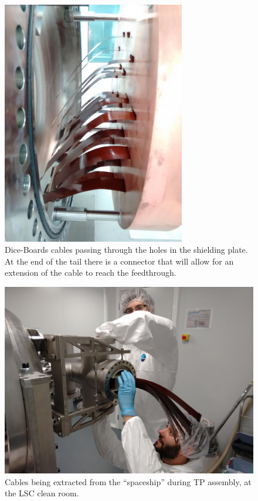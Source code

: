 \begin{figure}[hpt!]
\begin{center}
\includegraphics[width=8cm]{img2/cabling.png}
\caption{Dice-Boards cables passing through the holes in the shielding plate. At the end of the tail there is a connector that will allow for an extension of the cable to reach the feedthrough.}
\label{fig:cabling}
\end{center}
\end{figure}

\begin{figure}[hpt!]
\begin{center}
\includegraphics[width=12cm]{img2/cabling_spaceship.png}
\caption{Cables being extracted from the ``spaceship'' during TP assembly, at the LSC clean room.}
\label{fig:cabling_spaceship}
\end{center}
\end{figure}

